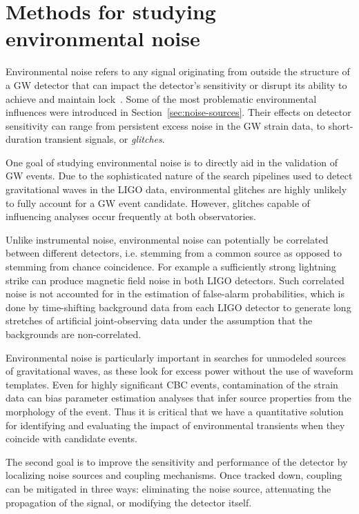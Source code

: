 \chapter{Methods for studying environmental noise}\label{ch:noise-methods}

Environmental noise refers to any signal originating from outside the structure of a \ac{GW} detector that can impact the detector's sensitivity or disrupt its ability to achieve and maintain lock~\citep{Effler_2015,Nguyen_2021}.
Some of the most problematic environmental influences were introduced in Section~\ref{sec:noise-sources}.
Their effects on detector sensitivity can range from persistent excess noise in the \ac{GW} strain data, to short-duration transient signals, or \textit{glitches}.

One goal of studying environmental noise is to directly aid in the validation of \ac{GW} events.
Due to the sophisticated nature of the search pipelines used to detect gravitational waves in the \ac{LIGO} data, environmental glitches are highly unlikely to fully account for a \ac{GW} event candidate.
However, glitches capable of influencing analyses occur frequently at both observatories.

Unlike instrumental noise, environmental noise can potentially be correlated between different detectors, i.e. stemming from a common source as opposed to stemming from chance coincidence.
For example a sufficiently strong lightning strike can produce magnetic field noise in both LIGO detectors.
Such correlated noise is not accounted for in the estimation of false-alarm probabilities, which is done by time-shifting background data from each LIGO detector to generate long stretches of artificial joint-observing data under the assumption that the backgrounds are non-correlated.

Environmental noise is particularly important in searches for unmodeled sources of gravitational waves, as these look for excess power without the use of waveform templates.
Even for highly significant \ac{CBC} events, contamination of the strain data can bias parameter estimation analyses that infer source properties from the morphology of the event.
Thus it is critical that we have a quantitative solution for identifying and evaluating the impact of environmental transients when they coincide with candidate events.

The second goal is to improve the sensitivity and performance of the detector by localizing noise sources and coupling mechanisms. Once tracked down, coupling can be mitigated in three ways: eliminating the noise source, attenuating the propagation of the signal, or modifying the detector itself.

